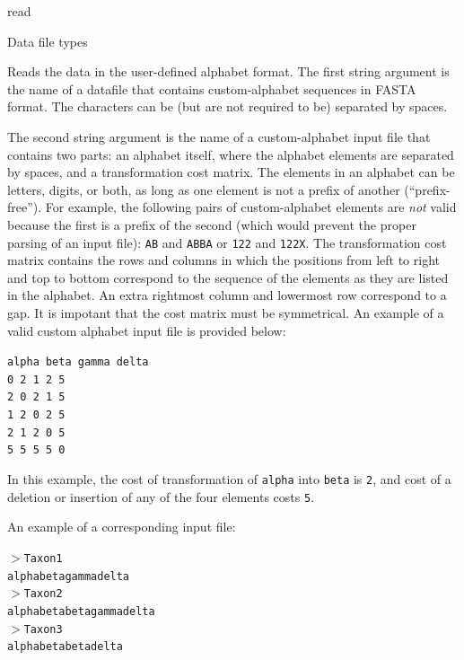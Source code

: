 \begin{command}{read}{}
\begin{arguments}
\begin{argumentgroup}{Data file types}
            {Reads the data in the user-defined alphabet format. The first string argument is
            the name of a datafile that contains custom-alphabet sequences in FASTA format. 
            The characters can be (but are not required to be) separated by spaces.
            
            The second string argument is the name of a custom-alphabet input file that contains two parts:
            an alphabet itself, where the alphabet elements are separated by spaces, and a
            transformation cost matrix. The elements in an alphabet can be letters, digits, or
            both, as long as one element is not a prefix of another  (``prefix-free''). For
            example, the following pairs of custom-alphabet elements are \emph{not} valid
            because the first is a prefix of the second (which would prevent the proper parsing of
            an input file): \texttt{AB} and \texttt{ABBA} or \texttt{122} and \texttt{122X}.
            The transformation cost matrix contains the rows and columns in which the
            positions from left to right and top to bottom correspond to the sequence of the
            elements as they are listed in the alphabet. An extra rightmost column and lowermost
            row correspond to a gap. It is impotant that the cost matrix must be symmetrical. An example 
            of a valid custom alphabet input file is provided below:
       	  
	  \texttt{alpha beta gamma delta \\
            0 2 1 2 5 \\
            2 0 2 1 5 \\
            1 2 0 2 5 \\
            2 1 2 0 5 \\
            5 5 5 5 0}
            
           In this example, the cost of transformation of \texttt{alpha} into \texttt{beta} is \texttt{2},
           and cost of a deletion or insertion of any of the four elements costs \texttt{5}.
           
           An example of a corresponding input file:
       
           \texttt{$>$Taxon1\\
	alphabetagammadelta\\
	$>$Taxon2\\
	alphabetabetagammadelta\\
	$>$Taxon3\\
	alphabetabetadelta}
	
}
\end{argumentgroup}
\end{arguments}
\end{command}
